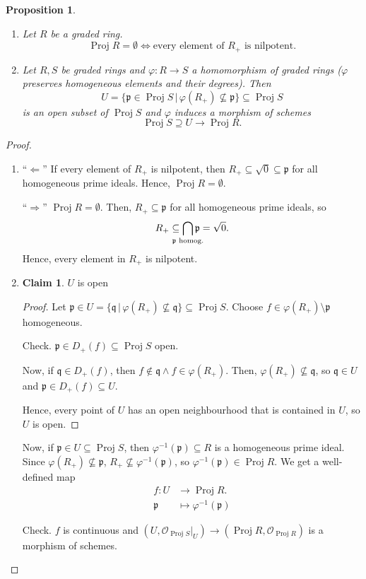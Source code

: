\documentclass[12pt]{article}
\DeclareMathOperator{\Proj}{Proj}
\newtheorem*{proposition}{Proposition}
\theoremstyle{definition}
\newtheorem*{claim}{Claim}
\theoremstyle{remark}
\begin{document}
\begin{proposition}
\begin{enumerate}[label=\arabic*)]
\item Let $R$ be a graded ring.
\[\Proj R=\emptyset\Longleftrightarrow\text{every element of }R_+\text{ is nilpotent}.\]

\item Let $R,S$ be graded rings and $\varphi:R\rightarrow S$ a homomorphism of graded rings ($\varphi$ preserves homogeneous elements and their degrees). Then
\[U=\big\{\mathfrak{p}\in\Proj S\,\big|\,\varphi(R_+)\not\subseteq\mathfrak{p}\big\}\subseteq\Proj S\]
is an open subset of $\Proj S$ and $\varphi$ induces a morphism of schemes
\[\Proj S\supseteq U\longrightarrow\Proj R.\]
\end{enumerate}
\end{proposition}

\begin{proof}
\begin{enumerate}[label=\arabic*)]
\item ``$\Leftarrow$'' If every element of $R_+$ is nilpotent, then $R_+\subseteq\sqrt{0}\subseteq\mathfrak{p}$ for all homogeneous prime ideals. Hence, $\Proj R=\emptyset$.

``$\Rightarrow$'' $\Proj R=\emptyset$. Then, $R_+\subseteq\mathfrak{p}$ for all homogeneous prime ideals, so
\[R_+\subseteq\bigcap_{\mathclap{\mathfrak{p}\text{ homog.}}}\mathfrak{p}=\sqrt{0}.\]
Hence, every element in $R_+$ is nilpotent.

\item
\begin{claim}
$U$ is open
\end{claim}

\begin{proof}
Let $\mathfrak{p}\in U=\{\mathfrak{q}\,|\,\varphi(R_+)\not\subseteq\mathfrak{q}\}\subseteq\Proj S$. Choose $f\in\varphi(R_+)\setminus\mathfrak{p}$ homogeneous.

Check. $\mathfrak{p}\in D_+(f)\subseteq\Proj S$ open.

Now, if $\mathfrak{q}\in D_+(f)$, then $f\notin\mathfrak{q}\wedge f\in\varphi(R_+)$. Then, $\varphi(R_+)\not\subseteq\mathfrak{q}$, so $\mathfrak{q}\in U$ and $\mathfrak{p}\in D_+(f)\subseteq U$.

Hence, every point of $U$ has an open neighbourhood that is contained in $U$, so $U$ is open.
\end{proof}

Now, if $\mathfrak{p}\in U\subseteq\Proj S$, then $\varphi^{-1}(\mathfrak{p})\subseteq R$ is a homogeneous prime ideal. Since $\varphi(R_+)\not\subseteq\mathfrak{p}$, $R_+\not\subseteq\varphi^{-1}(\mathfrak{p})$, so $\varphi^{-1}(\mathfrak{p})\in\Proj R$. We get a well-defined map
\begin{align*}
f:U&\longrightarrow\Proj R.\\
\mathfrak{p}&\longmapsto\varphi^{-1}(\mathfrak{p})
\end{align*}

Check. $f$ is continuous and $(U,\mathcal{O}_{\Proj S}|_U)\rightarrow(\Proj R,\mathcal{O}_{\Proj R})$ is a morphism of schemes.
\end{enumerate}
\end{proof}
\end{document}
